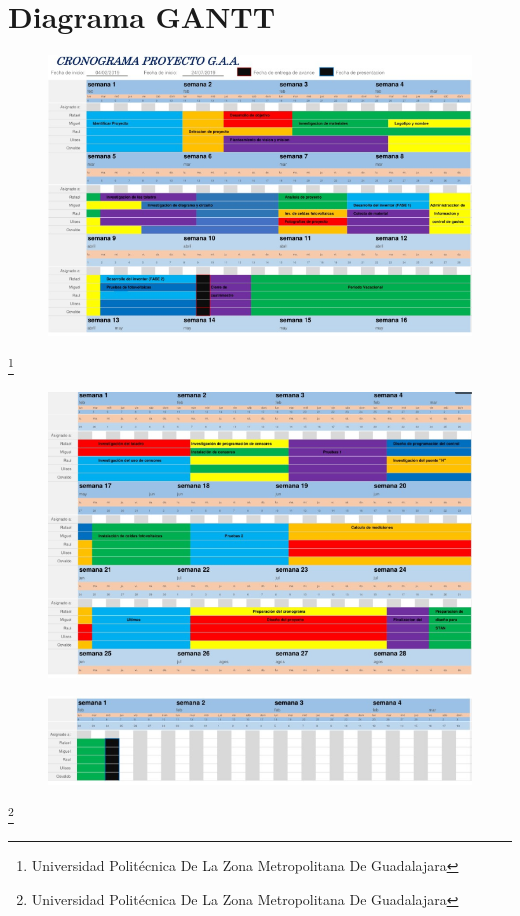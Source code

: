 \documentclass[11pt,a4paper]{article}
\begin{document}
 \section{Diagrama GANTT}
 \begin{figure}[hbtp]
 \centering
  \includegraphics[scale=0.85]{Diagrama(01).png} 
 \end{figure}
  \footnote{Universidad Politécnica De La Zona Metropolitana De Guadalajara} 
  \pagebreak
 \begin{figure}[hbtp]
 \centering
  \includegraphics[scale=0.85]{Digrama(02).png} 
 \end{figure}
\begin{figure}[hbtp]
 \centering
  \includegraphics[scale=0.85]{Diagrama(03).png} 
 \end{figure}
  \footnote{Universidad Politécnica De La Zona Metropolitana De Guadalajara} 
\pagebreak
\end{document}

